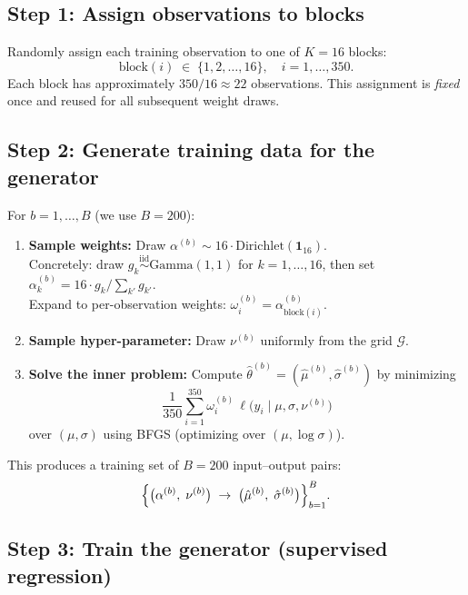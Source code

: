 \documentclass[12pt]{article}
\begin{document}
\subsection{Step 1: Assign observations to blocks}

Randomly assign each training observation to one of $K=16$ blocks:
\[
\text{block}(i) \;\in\; \{1,2,\ldots,16\}, \quad i = 1,\ldots,350.
\]
Each block has approximately $350/16 \approx 22$ observations.  This assignment is \emph{fixed} once and reused for all subsequent weight draws.

\subsection{Step 2: Generate training data for the generator}

For $b = 1,\ldots,B$ (we use $B=200$):
\begin{enumerate}
\item \textbf{Sample weights:}  Draw $\alpha^{(b)} \sim 16 \cdot \mathrm{Dirichlet}(\mathbf{1}_{16})$.\\
Concretely: draw $g_k \stackrel{\mathrm{iid}}{\sim} \mathrm{Gamma}(1,1)$ for $k=1,\ldots,16$, then set $\alpha_k^{(b)} = 16 \cdot g_k / \sum_{k'} g_{k'}$.\\
Expand to per-observation weights: $\omega_i^{(b)} = \alpha_{\mathrm{block}(i)}^{(b)}$.

\item \textbf{Sample hyper-parameter:}  Draw $\nu^{(b)}$ uniformly from the grid $\mathcal{G}$.

\item \textbf{Solve the inner problem:}  Compute $\hat\theta^{(b)} = (\hat\mu^{(b)}, \hat\sigma^{(b)})$ by minimizing
\[
\frac{1}{350}\sum_{i=1}^{350} \omega_i^{(b)}\,\ell\!\bigl(y_i \mid \mu,\sigma,\nu^{(b)}\bigr)
\]
over $(\mu,\sigma)$ using BFGS (optimizing over $(\mu,\log\sigma)$).
\end{enumerate}

This produces a training set of $B=200$ input--output pairs:
\[
\Bigl\{\bigl(\alpha^{(b)},\;\nu^{(b)}\bigr) \;\to\; \bigl(\hat\mu^{(b)},\;\hat\sigma^{(b)}\bigr)\Bigr\}_{b=1}^{B}.
\]

\subsection{Step 3: Train the generator (supervised regression)}
\end{document}

